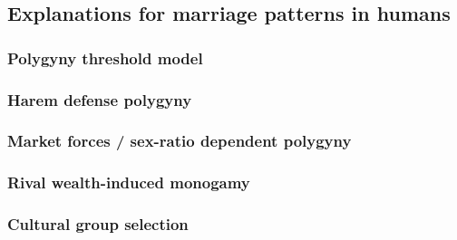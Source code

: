 \documentclass[
]{article}
\begin{document}
\hypertarget{explanations-for-marriage-patterns-in-humans}{%
\subsection{Explanations for marriage patterns in
humans}\label{explanations-for-marriage-patterns-in-humans}}

\hypertarget{polygyny-threshold-model}{%
\subsubsection{Polygyny threshold
model}\label{polygyny-threshold-model}}

\hypertarget{harem-defense-polygyny}{%
\subsubsection{Harem defense polygyny}\label{harem-defense-polygyny}}

\hypertarget{market-forces-sex-ratio-dependent-polygyny}{%
\subsubsection{Market forces / sex-ratio dependent
polygyny}\label{market-forces-sex-ratio-dependent-polygyny}}

\hypertarget{rival-wealth-induced-monogamy}{%
\subsubsection{Rival wealth-induced
monogamy}\label{rival-wealth-induced-monogamy}}

\hypertarget{cultural-group-selection}{%
\subsubsection{Cultural group
selection}\label{cultural-group-selection}}

  
\end{document}
